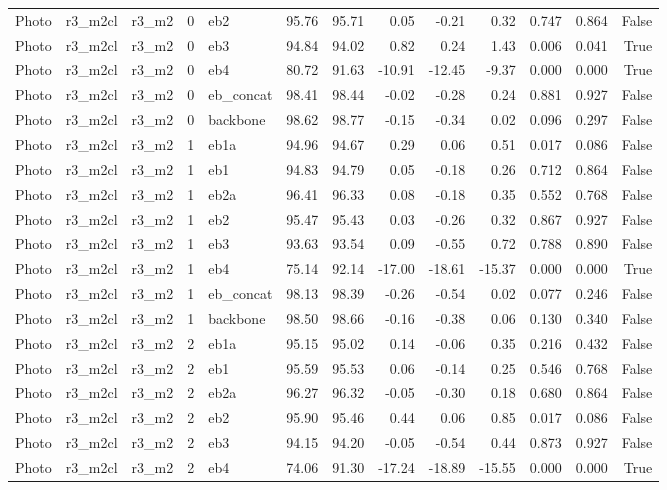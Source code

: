 \begin{table}
\begin{tabular}{lllrlrrrrrllr}
Photo & r3\_m2cl & r3\_m2 & 0 & eb2 & 95.76 & 95.71 & 0.05 & -0.21 & 0.32 & 0.747 & 0.864 & False \\
Photo & r3\_m2cl & r3\_m2 & 0 & eb3 & 94.84 & 94.02 & 0.82 & 0.24 & 1.43 & 0.006 & 0.041 & True \\
Photo & r3\_m2cl & r3\_m2 & 0 & eb4 & 80.72 & 91.63 & -10.91 & -12.45 & -9.37 & 0.000 & 0.000 & True \\
Photo & r3\_m2cl & r3\_m2 & 0 & eb\_concat & 98.41 & 98.44 & -0.02 & -0.28 & 0.24 & 0.881 & 0.927 & False \\
Photo & r3\_m2cl & r3\_m2 & 0 & backbone & 98.62 & 98.77 & -0.15 & -0.34 & 0.02 & 0.096 & 0.297 & False \\
Photo & r3\_m2cl & r3\_m2 & 1 & eb1a & 94.96 & 94.67 & 0.29 & 0.06 & 0.51 & 0.017 & 0.086 & False \\
Photo & r3\_m2cl & r3\_m2 & 1 & eb1 & 94.83 & 94.79 & 0.05 & -0.18 & 0.26 & 0.712 & 0.864 & False \\
Photo & r3\_m2cl & r3\_m2 & 1 & eb2a & 96.41 & 96.33 & 0.08 & -0.18 & 0.35 & 0.552 & 0.768 & False \\
Photo & r3\_m2cl & r3\_m2 & 1 & eb2 & 95.47 & 95.43 & 0.03 & -0.26 & 0.32 & 0.867 & 0.927 & False \\
Photo & r3\_m2cl & r3\_m2 & 1 & eb3 & 93.63 & 93.54 & 0.09 & -0.55 & 0.72 & 0.788 & 0.890 & False \\
Photo & r3\_m2cl & r3\_m2 & 1 & eb4 & 75.14 & 92.14 & -17.00 & -18.61 & -15.37 & 0.000 & 0.000 & True \\
Photo & r3\_m2cl & r3\_m2 & 1 & eb\_concat & 98.13 & 98.39 & -0.26 & -0.54 & 0.02 & 0.077 & 0.246 & False \\
Photo & r3\_m2cl & r3\_m2 & 1 & backbone & 98.50 & 98.66 & -0.16 & -0.38 & 0.06 & 0.130 & 0.340 & False \\
Photo & r3\_m2cl & r3\_m2 & 2 & eb1a & 95.15 & 95.02 & 0.14 & -0.06 & 0.35 & 0.216 & 0.432 & False \\
Photo & r3\_m2cl & r3\_m2 & 2 & eb1 & 95.59 & 95.53 & 0.06 & -0.14 & 0.25 & 0.546 & 0.768 & False \\
Photo & r3\_m2cl & r3\_m2 & 2 & eb2a & 96.27 & 96.32 & -0.05 & -0.30 & 0.18 & 0.680 & 0.864 & False \\
Photo & r3\_m2cl & r3\_m2 & 2 & eb2 & 95.90 & 95.46 & 0.44 & 0.06 & 0.85 & 0.017 & 0.086 & False \\
Photo & r3\_m2cl & r3\_m2 & 2 & eb3 & 94.15 & 94.20 & -0.05 & -0.54 & 0.44 & 0.873 & 0.927 & False \\
Photo & r3\_m2cl & r3\_m2 & 2 & eb4 & 74.06 & 91.30 & -17.24 & -18.89 & -15.55 & 0.000 & 0.000 & True \\

\end{tabular}
\end{table}
